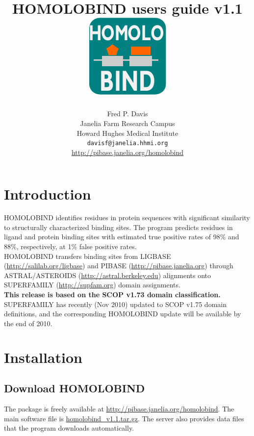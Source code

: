 \documentclass[11pt]{article}
\title{HOMOLOBIND users guide v1.1\\
\vspace{0.5cm}
\includegraphics[scale=0.7]{homolobind_logo.pdf}
}
\author{Fred P. Davis\\Janelia Farm Research Campus\\Howard Hughes Medical Institute\\{\tt davisf@janelia.hhmi.org}\\\url{http://pibase.janelia.org/homolobind}}
\begin{document}
\maketitle

\tableofcontents

\section{Introduction}
HOMOLOBIND identifies residues in protein sequences with significant similarity to structurally characterized binding sites. The program predicts residues in ligand and protein binding sites with estimated true positive rates of 98\% and 88\%, respectively, at 1\% false positive rates.\\

HOMOLOBIND transfers binding sites from LIGBASE (\url{http://salilab.org/ligbase}) and PIBASE (\url{http://pibase.janelia.org}) through ASTRAL/ASTEROIDS (\url{http://astral.berkeley.edu}) alignments onto SUPERFAMILY (\url{http://supfam.org}) domain assignments.\\

{\bf This release is based on the SCOP v1.73 domain classification.} SUPERFAMILY has recently (Nov 2010) updated to SCOP v1.75 domain definitions, and the corresponding HOMOLOBIND update will be available by the end of 2010.

\section{Installation}
\subsection{Download HOMOLOBIND}

The package is freely available at \url{http://pibase.janelia.org/homolobind}. The main software file is \href{http://research.janelia.org/davis/homolobind/files/homolobind_v1.1.tar.gz}{homolobind\_v1.1.tar.gz}. The server also provides data files that the program downloads automatically.
\end{document}
